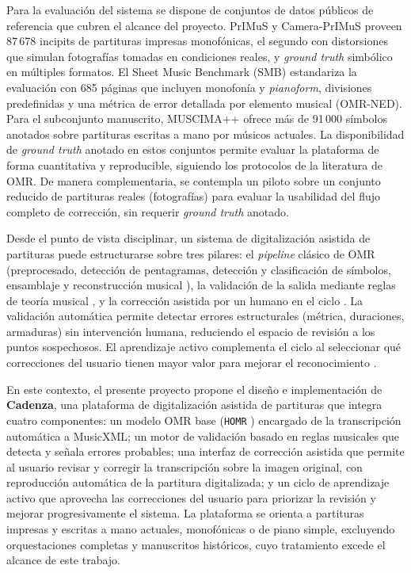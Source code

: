 Para la evaluaci\'on del sistema se dispone de conjuntos de datos
p\'ublicos de referencia que cubren el alcance del proyecto. PrIMuS y
Camera-PrIMuS \cite{calvo2018} proveen 87\,678 incipits de partituras
impresas monof\'onicas, el segundo con distorsiones que simulan fotograf\'ias
tomadas en condiciones reales, y \emph{ground truth} simb\'olico en
m\'ultiples formatos. El Sheet Music Benchmark (SMB)
\cite{smb2026} estandariza la evaluaci\'on con 685 p\'aginas que incluyen
monofon\'ia y \emph{pianoform}, divisiones predefinidas y una m\'etrica de
error detallada por elemento musical (OMR-NED). Para el subconjunto
manuscrito, MUSCIMA++ \cite{muscima2017} ofrece m\'as de 91\,000 s\'imbolos
anotados sobre partituras escritas a mano por m\'usicos actuales. La
disponibilidad de \emph{ground truth} anotado en estos conjuntos permite
evaluar la plataforma de forma cuantitativa y reproducible, siguiendo los
protocolos de la literatura de OMR. De manera complementaria, se contempla
un piloto sobre un conjunto reducido de partituras reales (fotograf\'ias)
para evaluar la usabilidad del flujo completo de correcci\'on, sin requerir
\emph{ground truth} anotado.

Desde el punto de vista disciplinar, un sistema de digitalizaci\'on
asistida de partituras puede estructurarse sobre tres pilares: el
\emph{pipeline} cl\'asico de OMR (preprocesado, detecci\'on de pentagramas,
detecci\'on y clasificaci\'on de s\'imbolos, ensamblaje y reconstrucci\'on
musical \cite{omr2020}), la validaci\'on de la salida
mediante reglas de teor\'ia musical \cite{cuthbert2010}, y la correcci\'on
asistida por un humano en el ciclo \cite{amershi2014}. La validaci\'on
autom\'atica permite detectar errores estructurales (m\'etrica, duraciones,
armaduras) sin intervenci\'on humana, reduciendo el espacio de revisi\'on a
los puntos sospechosos. El aprendizaje activo complementa el ciclo al
seleccionar qu\'e correcciones del usuario tienen mayor valor para mejorar
el reconocimiento \cite{settles2009}.

En este contexto, el presente proyecto propone el dise\~no e
implementaci\'on de \textbf{Cadenza}, una plataforma de digitalizaci\'on
asistida de partituras que integra cuatro componentes: un modelo OMR base
(\texttt{HOMR} \cite{homr2024}) encargado de la transcripci\'on autom\'atica a
MusicXML; un motor de validaci\'on basado en reglas musicales que detecta y
se\~nala errores probables; una interfaz de correcci\'on asistida que
permite al usuario revisar y corregir la transcripci\'on sobre la imagen
original, con reproducci\'on autom\'atica de la partitura digitalizada; y un ciclo
de aprendizaje activo que aprovecha las correcciones
del usuario para priorizar la revisi\'on y mejorar progresivamente el
sistema. La plataforma se orienta a partituras impresas y escritas a mano
actuales, monof\'onicas o de piano simple, excluyendo orquestaciones
completas y manuscritos hist\'oricos, cuyo tratamiento excede el alcance de
este trabajo.
